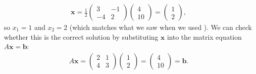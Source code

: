 \documentclass[letterpaper,10pt,english]{jupyterBook}
\begin{document}
\begin{equation*}
\begin{split} \mathbf{x} = \frac{1}{2}
\begin{pmatrix}
    3 & -1 \\
    -4 & 2
\end{pmatrix}
    \begin{pmatrix} 4 \\ 10 \end{pmatrix} =
    \begin{pmatrix} 1 \\ 2 \end{pmatrix},\end{split}
\end{equation*}
\sphinxAtStartPar
so \(x_1 = 1\) and \(x_2 = 2\) (which matches what we saw when we used {\hyperref[\detokenize{_pages/2.0_Linear_systems:solving-systems-of-linear-equations-using-algebra-section}]{}}). We can check whether this is the correct solution by substituting \(\mathbf{x}\) into the matrix equation \(A\mathbf{x} = \mathbf{b}\):
\begin{equation*}
\begin{split}A \mathbf{x} = \begin{pmatrix} 2 & 1 \\ 4 & 3 \end{pmatrix}
    \begin{pmatrix} 1 \\ 2 \end{pmatrix} =
    \begin{pmatrix} 4 \\ 10 \end{pmatrix} = \mathbf{b}.\end{split}
\end{equation*}
\end{document}
